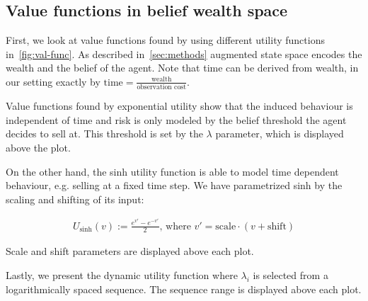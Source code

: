 \subsection{Value functions in belief wealth space}\label{ssec:val-func}

First, we look at value functions found by using different utility functions in~\autoref{fig:val-func}.
As described in~\autoref{sec:methods} augmented state space encodes the wealth and the belief of the agent. Note that time can be derived from wealth, in our setting exactly by $\text{time} = \frac{\text{wealth}}{\text{observation\ cost}}$.

Value functions found by exponential utility show that the induced behaviour is independent of time and risk is only modeled by the belief threshold the agent decides to sell at. This threshold is set by the $\lambda$ parameter, which is displayed above the plot.

On the other hand, the sinh utility function is able to model time dependent behaviour, e.g. selling at a fixed time step. We have parametrized sinh by the scaling and shifting of its input:

\begin{align*}
    U_\text{sinh}(v) := \frac{e^{v'} - e^{-v'}}{2} \text{, where\ } v' = \text{scale}\cdot(v+\text{shift})
\end{align*}

Scale and shift parameters are displayed above each plot.

Lastly, we present the dynamic utility function where $\lambda_i$ is selected from a logarithmically spaced sequence. The sequence range is displayed above each plot.


